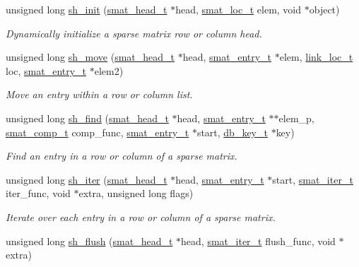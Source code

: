 \begin{CompactItemize}
unsigned long \hyperlink{group__dbprim__smat_ga18}{sh\_\-init} (\hyperlink{struct__smat__head__s}{smat\_\-head\_\-t} $\ast$head, \hyperlink{group__dbprim__smat_ga6}{smat\_\-loc\_\-t} elem, void $\ast$object)
\begin{CompactList}\small\item\em Dynamically initialize a sparse matrix row or column head. \item\end{CompactList}\item 
unsigned long \hyperlink{group__dbprim__smat_ga19}{sh\_\-move} (\hyperlink{struct__smat__head__s}{smat\_\-head\_\-t} $\ast$head, \hyperlink{struct__smat__entry__s}{smat\_\-entry\_\-t} $\ast$elem, \hyperlink{group__dbprim__link_ga4}{link\_\-loc\_\-t} loc, \hyperlink{struct__smat__entry__s}{smat\_\-entry\_\-t} $\ast$elem2)
\begin{CompactList}\small\item\em Move an entry within a row or column list. \item\end{CompactList}\item 
unsigned long \hyperlink{group__dbprim__smat_ga20}{sh\_\-find} (\hyperlink{struct__smat__head__s}{smat\_\-head\_\-t} $\ast$head, \hyperlink{struct__smat__entry__s}{smat\_\-entry\_\-t} $\ast$$\ast$elem\_\-p, \hyperlink{group__dbprim__smat_ga5}{smat\_\-comp\_\-t} comp\_\-func, \hyperlink{struct__smat__entry__s}{smat\_\-entry\_\-t} $\ast$start, \hyperlink{struct__db__key__s}{db\_\-key\_\-t} $\ast$key)
\begin{CompactList}\small\item\em Find an entry in a row or column of a sparse matrix. \item\end{CompactList}\item 
unsigned long \hyperlink{group__dbprim__smat_ga21}{sh\_\-iter} (\hyperlink{struct__smat__head__s}{smat\_\-head\_\-t} $\ast$head, \hyperlink{struct__smat__entry__s}{smat\_\-entry\_\-t} $\ast$start, \hyperlink{group__dbprim__smat_ga4}{smat\_\-iter\_\-t} iter\_\-func, void $\ast$extra, unsigned long flags)
\begin{CompactList}\small\item\em Iterate over each entry in a row or column of a sparse matrix. \item\end{CompactList}\item 
unsigned long \hyperlink{group__dbprim__smat_ga22}{sh\_\-flush} (\hyperlink{struct__smat__head__s}{smat\_\-head\_\-t} $\ast$head, \hyperlink{group__dbprim__smat_ga4}{smat\_\-iter\_\-t} flush\_\-func, void $\ast$extra)
$$
\end{CompactItemize}
